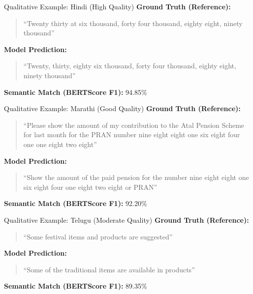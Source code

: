 \documentclass[aspectratio=169]{beamer}
\begin{document}
\begin{frame}{Qualitative Example: Hindi (High Quality)}
    \textbf{Ground Truth (Reference):}
    \begin{quote}
    ``Twenty thirty at six thousand, forty four thousand, eighty eight, ninety thousand''
    \end{quote}
    
    \textbf{Model Prediction:}
    \begin{quote}
    ``Twenty, thirty, eighty six thousand, forty four thousand, eighty eight, ninety thousand''
    \end{quote}
    
    \vspace{0.3cm}
    \textbf{Semantic Match (BERTScore F1):} \textcolor{green!70!black}{94.85\%}
\end{frame}

\begin{frame}{Qualitative Example: Marathi (Good Quality)}
    \textbf{Ground Truth (Reference):}
    \begin{quote}
    ``Please show the amount of my contribution to the Atal Pension Scheme for last month for the PRAN number nine eight eight one six eight four one one eight two eight''
    \end{quote}
    
    \textbf{Model Prediction:}
    \begin{quote}
    ``Show the amount of the paid pension for the number nine eight eight one six eight four one eight two eight or PRAN''
    \end{quote}
    
    \vspace{0.3cm}
    \textbf{Semantic Match (BERTScore F1):} \textcolor{green!70!black}{92.20\%}
\end{frame}

\begin{frame}{Qualitative Example: Telugu (Moderate Quality)}
    \textbf{Ground Truth (Reference):}
    \begin{quote}
    ``Some festival items and products are suggested''
    \end{quote}
    
    \textbf{Model Prediction:}
    \begin{quote}
    ``Some of the traditional items are available in products''
    \end{quote}
    
    \vspace{0.3cm}
    \textbf{Semantic Match (BERTScore F1):} \textcolor{orange!90!black}{89.35\%}
\end{frame}
\end{document}
